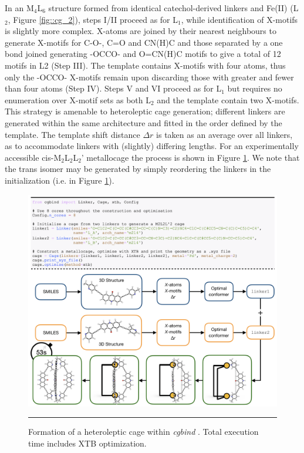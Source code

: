\documentclass[../../main.tex]{subfiles}
\newcommand{\cgbind}{\emph{cgbind }}
\newcommand{\MLs}{M$_4$L$_6$ }
\begin{document}
In an \MLs structure formed from identical catechol-derived linkers and Fe(II) (L${}_2$, Figure \ref{fig::cg_2}),\cite{Caulder1998} steps I/II proceed as for L${}_1$, while identification of X-motifs is slightly more complex. X-atoms are joined by their nearest neighbours to generate X-motifs for C-O-, C=O and CN(H)C and those separated by a one bond joined generating -OCCO- and O=CN(H)C motifs to give a total of 12 motifs in L2 (Step III). The template contains X-motifs with four atoms, thus only the -OCCO- X-motifs remain upon discarding those with greater and fewer than four atoms (Step IV). Steps V and VI proceed as for L${}_1$ but requires no enumeration over X-motif sets as both L${}_2$ and the template contain two X-motifs.
This strategy is amenable to heteroleptic cage generation; different linkers are generated within the same architecture and fitted in the order defined by the template. The template shift distance $\Delta r$ is taken as an average over all linkers, as to accommodate linkers with (slightly) differing lengths. For an experimentally accessible cis-M$_2$L$_2$L$_2$’ metallocage\cite{Zhu2018} the process is shown in Figure \ref{fig::cg_3}. We note that the trans isomer may be generated by simply reordering the linkers in the  initialization (i.e.  in Figure \ref{fig::cg_3}).


\begin{figure}[h!]
	\vspace{0.4cm}
	\centering
	\includegraphics[width=\textwidth]{3/cgbind/figs/fig3}
	\vspace{0.2cm}
	\hrule
	\caption{Formation of a heteroleptic cage within \cgbind. Total execution time includes XTB optimization.}
	\label{fig::cg_3}
\end{figure}
\end{document}
